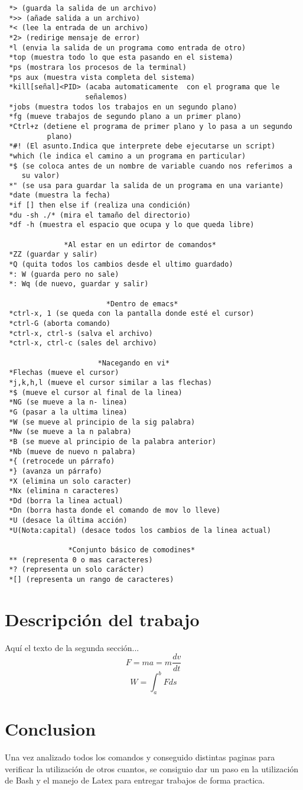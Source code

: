 \documentclass{article}
\begin{document}
\begin{verbatim}
 *> (guarda la salida de un archivo)
 *>> (añade salida a un archivo)
 *< (lee la entrada de un archivo)
 *2> (redirige mensaje de error)
 *l (envia la salida de un programa como entrada de otro)
 *top (muestra todo lo que esta pasando en el sistema)
 *ps (mostrara los procesos de la terminal)
 *ps aux (muestra vista completa del sistema)
 *kill[señal]<PID> (acaba automaticamente  con el programa que le
                   señalemos)
 *jobs (muestra todos los trabajos en un segundo plano)
 *fg (mueve trabajos de segundo plano a un primer plano)
 *Ctrl+z (detiene el programa de primer plano y lo pasa a un segundo
          plano)
 *#! (El asunto.Indica que interprete debe ejecutarse un script)
 *which (le indica el camino a un programa en particular)
 *$ (se coloca antes de un nombre de variable cuando nos referimos a
    su valor)
 *" (se usa para guardar la salida de un programa en una variante)
 *date (muestra la fecha)
 *if [] then else if (realiza una condición)
 *du -sh ./* (mira el tamaño del directorio)
 *df -h (muestra el espacio que ocupa y lo que queda libre)
 
              *Al estar en un edirtor de comandos*
 *ZZ (guardar y salir)
 *Q (quita todos los cambios desde el ultimo guardado)
 *: W (guarda pero no sale)
 *: Wq (de nuevo, guardar y salir)
 
                        *Dentro de emacs*
 *ctrl-x, 1 (se queda con la pantalla donde esté el cursor)
 *ctrl-G (aborta comando)
 *ctrl-x, ctrl-s (salva el archivo)
 *ctrl-x, ctrl-c (sales del archivo)
 
                      *Nacegando en vi*
 *Flechas (mueve el cursor)
 *j,k,h,l (mueve el cursor similar a las flechas)
 *$ (mueve el cursor al final de la linea)
 *NG (se mueve a la n- linea)
 *G (pasar a la ultima linea)
 *W (se mueve al principio de la sig palabra)
 *Nw (se mueve a la n palabra)
 *B (se mueve al principio de la palabra anterior)
 *Nb (mueve de nuevo n palabra)
 *{ (retrocede un párrafo)
 *} (avanza un párrafo)
 *X (elimina un solo caracter)
 *Nx (elimina n caracteres)
 *Dd (borra la linea actual)
 *Dn (borra hasta donde el comando de mov lo lleve)
 *U (desace la última acción)
 *U(Nota:capital) (desace todos los cambios de la linea actual)

               *Conjunto básico de comodines*
 ** (representa 0 o mas caracteres)
 *? (representa un solo carácter)
 *[] (representa un rango de caracteres)
\end{verbatim}

\section{Descripción del trabajo}
Aquí el texto de la segunda sección...
\begin{equation}
F=ma=m\frac{dv}{dt}
\end{equation}
\begin{equation}
W=\int_{a}^{b}F ds
\end{equation}
\section{Conclusion}
Una vez analizado todos los comandos y conseguido distintas paginas para verificar la utilización de otros cuantos, se consiguio dar un paso en la utilización de Bash y el manejo de Latex para entregar trabajos de forma practica.
\end{document}
